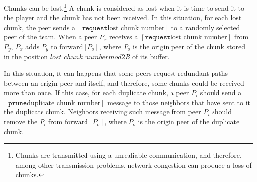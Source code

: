 
\label{sec:overlay_organization}

Chunks can be lost.\footnote{Chunks are transmitted using a
  unrealiable communication, and therefore, among other transmission
  problems, network congestion can produce a loss of chunks.} A chunk
is considered as lost when it is time to send it to the player and the
chunk has not been received.  In this situation, for each lost chunk,
the peer sends a $[\mathtt{request} \text{lost\_chunk\_number}]$ to a
randomly selected peer of the team. When a peer $P_x$ receives a
$[\mathtt{request} \text{lost\_chunk\_number}]$ from $P_y$, $P_x$ adds
$P_y$ to $\text{forward}[P_o]$, where $P_o$ is the origin peer of the
chunk stored in the position $lost\_chunk\_number \mathit{mod} 2B$ of
its buffer.

\begin{comment}
origin peer of the next chunk stored in the
buffer. This peer has to characteristics: (1) it is not necessary a
neighbor peer, and (2) there is a high probability that this chunk has
been stored in the buffer ``for a long time'', so, if it is not a
neighbor, the link between it and the peer is working fairly well.
\end{comment}

  
In this situation, it can happens that some peers request
redundant paths between an origin peer and itself, and therefore, some
chunks could be received more than once. If this case, for each
duplicate chunk, a peer $P_i$ should send a $[\mathtt{prune}
  \text{duplicate\_chunk\_number}]$ message to those neighbors that
have sent to it the duplicate chunk. Neighbors receiving such message
from peer $P_i$ should remove the $P_i$ from $\text{forward}[P_o]$,
where $P_o$ is the origin peer of the duplicate chunk.

